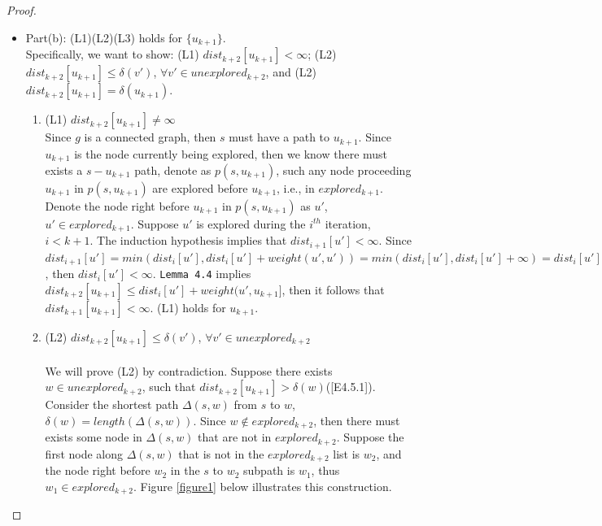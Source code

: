 \begin{proof}
\begin{itemize}
  \\\\
  \texttt{Proof of (L1)}: Since the induction hypothesis implies that $\forall q \in explored_{k+1}, dist_{k+1}[q] < \infty$, and the proof of (L3) above shows that $dist_{k+2}[q] = dist_{k+1}[q]$, then $dist_{k+2}[q] < \infty$. (L1) holds for $explored_{k+1}$.
  \\\\
  Hence we have proved that both (1) and (2) holds for all nodes in $explored_{k+1}$.

  \item Part(b): (L1)(L2)(L3) holds for $\{u_{k+1}\}$. 
  \\
  Specifically, we want to show: (L1) $dist_{k+2}[u_{k+1}] < \infty$; (L2) $dist_{k+2}[u_{k+1}] \leq \delta(v')$, $\forall v' \in unexplored_{k+2}$, and (L2) $dist_{k+2}[u_{k+1}] = \delta(u_{k+1})$. 


  \begin{enumerate}
  \item (L1) $dist_{k+2}[u_{k+1}] \neq \infty$
  \\
  Since $g$ is a connected graph, then $s$ must have a path to $u_{k+1}$. Since $u_{k+1}$ is the node currently being explored, then we know there must exists a $s-u_{k+1}$ path, denote as $p(s, u_{k+1})$, such any node proceeding $u_{k+1}$ in $p(s, u_{k+1})$ are explored before $u_{k+1}$, i.e., in $explored_{k+1}$. 
  \\
  Denote the node right before $u_{k+1}$ in $p(s, u_{k+1})$ as $u'$, $u' \in explored_{k+1}$. Suppose $u'$ is explored during the $i^{th}$ iteration, $i < k+1$. The induction hypothesis implies that $dist_{i+1}[u'] < \infty$. Since $dist_{i+1}[u'] = min(dist_i[u'], dist_i[u'] + weight(u', u')) = min(dist_i[u'], dist_i[u'] + \infty) = dist_i[u']$, then $ dist_i[u'] < \infty$. \texttt{Lemma 4.4} implies $dist_{k+2}[u_{k+1}] \leq dist_i[u'] + weight(u', u_{k+1}]$, then it follows that $dist_{k+1}[u_{k+1}] < \infty$. (L1) holds for $u_{k+1}$. 
  \\
  \item (L2) $dist_{k+2}[u_{k+1}] \leq \delta(v')$, $\forall v' \in unexplored_{k+2}$
  \\\\
  We will prove (L2) by contradiction. Suppose there exists $w \in unexplored_{k+2}$, such that $dist_{k+2}[u_{k+1}] > \delta(w)$([E4.5.1]). 
  \\
  Consider the shortest path $\Delta(s, w)$ from $s$ to $w$, $\delta(w) = length(\Delta(s, w))$. Since $w \notin explored_{k+2}$, then there must exists some node in $\Delta(s, w)$ that are not in $explored_{k+2}$. Suppose the first node along $\Delta(s, w)$ that is not in the $explored_{k+2}$ list is $w_2$, and the node right before $w_2$ in the $s$ to $w_2$ subpath is $w_1$, thus $w_1 \in explored_{k+2}$. Figure \ref{figure1} below illustrates this construction. 
  

\end{enumerate}
\end{itemize}
\end{proof}
